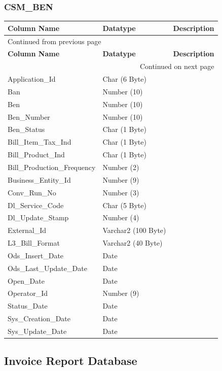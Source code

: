 \documentclass[12pt,twoside]{article}
\begin{document}
\normalsize
\subsubsection{CSM\_BEN}
\label{sec:orgheadline152}
\footnotesize

\begin{longtable}{l|l|l}
\hline
\textbf{Column Name} & \textbf{Datatype} & \textbf{Description}\\
\hline
\endfirsthead
\multicolumn{3}{l}{Continued from previous page} \\
\hline

\textbf{Column Name} & \textbf{Datatype} & \textbf{Description} \\

\hline
\endhead
\hline\multicolumn{3}{r}{Continued on next page} \\
\endfoot
\endlastfoot
\hline
Application\_Id & Char (6 Byte) & \\
Ban & Number (10) & \\
Ben & Number (10) & \\
Ben\_Number & Number (10) & \\
Ben\_Status & Char (1 Byte) & \\
Bill\_Item\_Tax\_Ind & Char (1 Byte) & \\
Bill\_Product\_Ind & Char (1 Byte) & \\
Bill\_Production\_Frequency & Number (2) & \\
Business\_Entity\_Id & Number (9) & \\
Conv\_Run\_No & Number (3) & \\
Dl\_Service\_Code & Char (5 Byte) & \\
Dl\_Update\_Stamp & Number (4) & \\
External\_Id & Varchar2 (100 Byte) & \\
L3\_Bill\_Format & Varchar2 (40 Byte) & \\
Ods\_Insert\_Date & Date & \\
Ods\_Last\_Update\_Date & Date & \\
Open\_Date & Date & \\
Operator\_Id & Number (9) & \\
Status\_Date & Date & \\
Sys\_Creation\_Date & Date & \\
Sys\_Update\_Date & Date & \\
\hline
\end{longtable}
\normalsize
\subsection{Invoice Report Database}
\label{sec:orgheadline157}
\end{document}
